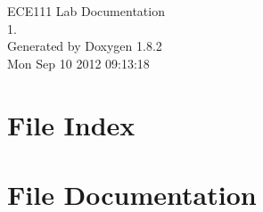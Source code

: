 \documentclass{book}
\begin{document}
\hypersetup{pageanchor=false,citecolor=blue}
\begin{titlepage}
\vspace*{7cm}
\begin{center}
{\Large E\-C\-E111 Lab Documentation \\[1ex]\large 1. }\\
\vspace*{1cm}
{\large Generated by Doxygen 1.8.2}\\
\vspace*{0.5cm}
{\small Mon Sep 10 2012 09:13:18}\\
\end{center}
\end{titlepage}
\clearemptydoublepage
{}
\tableofcontents
\clearemptydoublepage
{}
\hypersetup{pageanchor=true,citecolor=blue}
\chapter{File Index}

\chapter{File Documentation}


























\printindex
\end{document}
